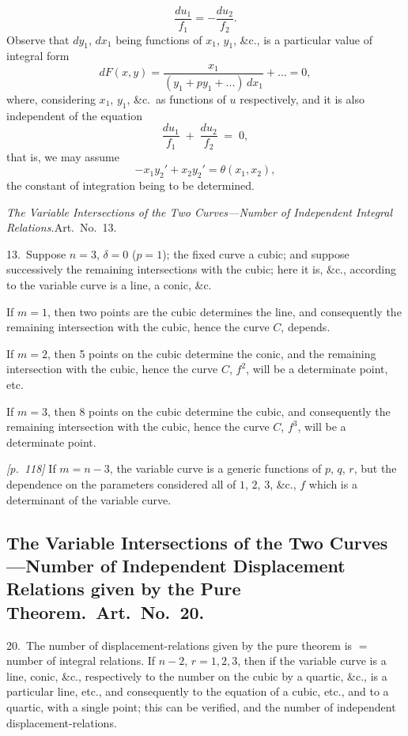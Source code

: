 \documentclass[11pt,a4paper]{article}
\theoremstyle{plain}
\theoremstyle{definition}
\theoremstyle{remark}
\begin{document}
\[
\frac{du_1}{f_1} = -\frac{du_2}{f_2}.
\]
Observe that $dy_1$, $dx_1$ being functions of $x_1$, $y_1$, \&c., is a particular value of integral form
\[
dF(x, y) = \frac{x_1}{(y_1 + p y_1 + ...)\,dx_1} + \ldots = 0,
\]
where, considering $x_1$, $y_1$, \&c.\ as functions of $u$ respectively, and it is also independent of the equation
\[
\frac{du_1}{f_1} \;+\; \frac{du_2}{f_2} \;=\; 0,
\]
that is, we may assume
\[
- x_1 y_2' + x_2 y_2' = \theta(x_1, x_2),
\]
the constant of integration being to be determined.

\textit{The Variable Intersections of the Two Curves---Number of Independent Integral Relations.}\quad Art.\ No.~13.

13.\ Suppose $n = 3$, $\delta = 0$ ($p = 1$); the fixed curve a cubic; and suppose successively the remaining intersections with the cubic; here it is, $\&$c., according to the variable curve is a line, a conic, \&c.

If $m = 1$, then two points are the cubic determines the line, and consequently the remaining intersection with the cubic, hence the curve $C$, depends.

If $m = 2$, then 5 points on the cubic determine the conic, and the remaining intersection with the cubic, hence the curve $C$, $f^2$, will be a determinate point, etc.

If $m = 3$, then 8 points on the cubic determine the cubic, and consequently the remaining intersection with the cubic, hence the curve $C$, $f^3$, will be a determinate point.

\bigskip\noindent\textit{[p.~118]} If $m = n - 3$, the variable curve is a generic functions of $p$, $q$, $r$, but the dependence on the parameters considered all of $1$, $2$, $3$, \&c., $f$ which is a determinant of the variable curve.

\subsection*{The Variable Intersections of the Two Curves---Number of Independent Displacement Relations given by the Pure Theorem.\ Art.\ No.~20.}

20.\ The number of displacement-relations given by the pure theorem is $=$ number of integral relations. If $n - 2$, $r = 1, 2, 3$, then if the variable curve is a line, conic, \&c., respectively to the number on the cubic by a quartic, \&c., is a particular line, etc., and consequently to the equation of a cubic, etc., and to a quartic, with a single point; this can be verified, and the number of independent displacement-relations.
\end{document}
